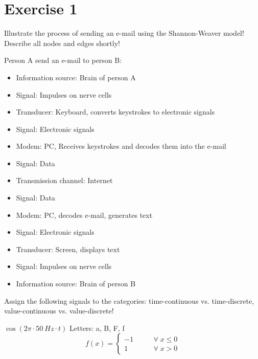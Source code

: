 %
%
%

{}
\section*{Exercise 1}

\begin{question}[subtitle={Shannon-Weaver Model}]
	Illustrate the process of sending an e-mail using the Shannon-Weaver model! Describe all nodes and edges shortly!
\end{question}

\begin{solution}
	Person A send an e-mail to person B:
	\begin{itemize}
		\item Information source: Brain of person A
		\item Signal: Impulses on nerve cells
		\item Transducer: Keyboard, converts keystrokes to electronic signals
		\item Signal: Electronic signals
		\item Modem: PC, Receives keystrokes and decodes them into the e-mail
		\item Signal: Data
		\item Transmission channel: Internet
		\item Signal: Data
		\item Modem: PC, decodes e-mail, generates text
		\item Signal: Electronic signals
		\item Transducer: Screen, displays text
		\item Signal: Impulses on nerve cells
		\item Information source: Brain of person B
	\end{itemize}
\end{solution}

\begin{question}[subtitle={Classes of Signals}]
	Assign the following signals to the categories: time-continuous vs. time-discrete, value-continuous vs. value-discrete!
	\begin{tasks}
		\task
		$\cos\left(2 \pi \cdot \SI{50}{Hz} \cdot t\right)$
		\task
		Letters: a, B, F, f
		\task
		\begin{equation*}
			f(x) = \begin{cases}
				-1 & \qquad \forall \; x \leq 0 \\
				1 & \qquad \forall \; x > 0
			\end{cases}
		\end{equation*}
	\end{tasks}
\end{question}

